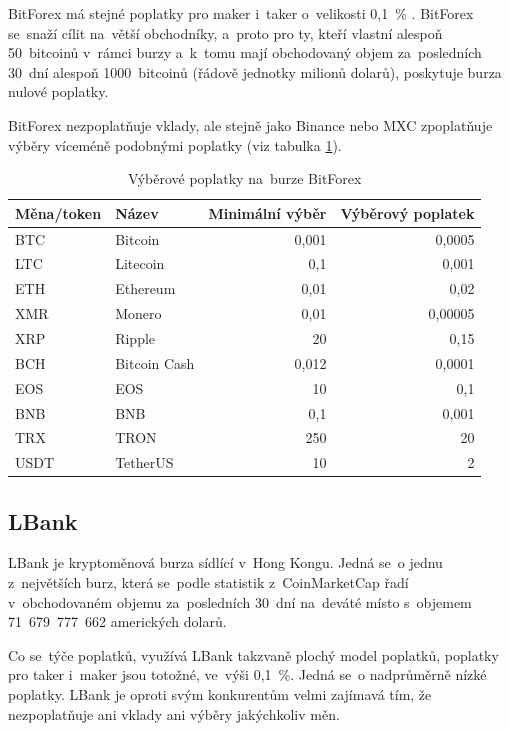 \documentclass[thesis=B,czech]{FITthesis}[2019/03/21]
\begin{document}
BitForex má stejné poplatky pro maker i~taker o~velikosti 0,1~\% . BitForex se~snaží cílit na~větší obchodníky, a~proto pro ty, kteří vlastní alespoň 50~bitcoinů v~rámci burzy a~k~tomu mají obchodovaný objem za~posledních 30~dní alespoň 1000~bitcoinů (řádově jednotky milionů dolarů), poskytuje burza nulové poplatky. 

BitForex nezpoplatňuje vklady, ale stejně jako Binance nebo MXC zpoplatňuje výběry víceméně podobnými poplatky (viz tabulka \ref{bitforex_fees}). \cite{cryptowisser_bitforex}

\begin{table}\centering
    \caption{Výběrové poplatky na~burze BitForex \cite{bitforex_fees}}
    \label{bitforex_fees}
    \begin{tabular}{||l | l | r | r||} 
     \hline
     Měna/token & Název & Minimální výběr & Výběrový poplatek \\ [0.5ex] 
     \hline\hline
     BTC & Bitcoin & 0,001 & 0,0005 \\ 
     \hline
     LTC & Litecoin & 0,1 & 0,001 \\
     \hline
     ETH & Ethereum & 0,01 & 0,02 \\
     \hline
     XMR & Monero & 0,01 & 0,00005 \\
     \hline
     XRP & Ripple & 20 & 0,15 \\
     \hline
     BCH & Bitcoin Cash & 0,012 & 0,0001 \\
     \hline
     EOS & EOS & 10 & 0,1 \\
     \hline
     BNB & BNB & 0,1 & 0,001 \\
     \hline
     TRX & TRON & 250 & 20 \\
     \hline
     USDT & TetherUS & 10 & 2 \\
     \hline
    \end{tabular}
\end{table}

\subsection{LBank}
LBank je kryptoměnová burza sídlící v~Hong Kongu. Jedná se~o jednu \linebreak z~největších burz, která se~podle statistik z~CoinMarketCap řadí v~obchodovaném objemu za~posledních 30~dní na~deváté místo s~objemem 71~679~777~662 amerických dolarů. \cite{coinmarketcap} \cite{cryptowisser_lbank}

Co se~týče poplatků, využívá LBank takzvaně plochý model poplatků, poplatky pro taker i~maker jsou totožné, ve~výši 0,1~\%. Jedná se~o nadprůměrně nízké poplatky. LBank je oproti svým konkurentům velmi zajímavá tím, že nezpoplatňuje ani vklady ani výběry jakýchkoliv měn. \cite{cryptowisser_lbank}
\end{document}
